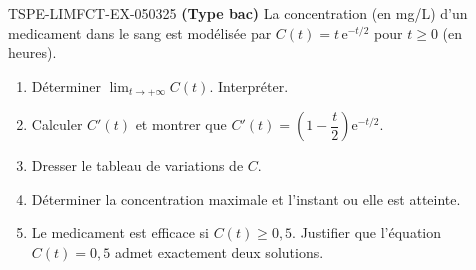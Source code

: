 \begin{exercice}{TSPE-LIMFCT-EX-050}{3}{25}
\textbf{(Type bac)} La concentration (en mg/L) d'un medicament dans le sang est modélisée par $C(t) = t\,\mathrm{e}^{-t/2}$ pour $t \geq 0$ (en heures).
\begin{enumerate}
  \item Déterminer $\lim_{t \to +\infty} C(t)$. Interpréter.
  \item Calculer $C'(t)$ et montrer que $C'(t) = \left(1 - \dfrac{t}{2}\right)\mathrm{e}^{-t/2}$.
  \item Dresser le tableau de variations de $C$.
  \item Déterminer la concentration maximale et l'instant ou elle est atteinte.
  \item Le medicament est efficace si $C(t) \geq 0{,}5$. Justifier que l'équation $C(t) = 0{,}5$ admet exactement deux solutions.
\end{enumerate}
\end{exercice}
